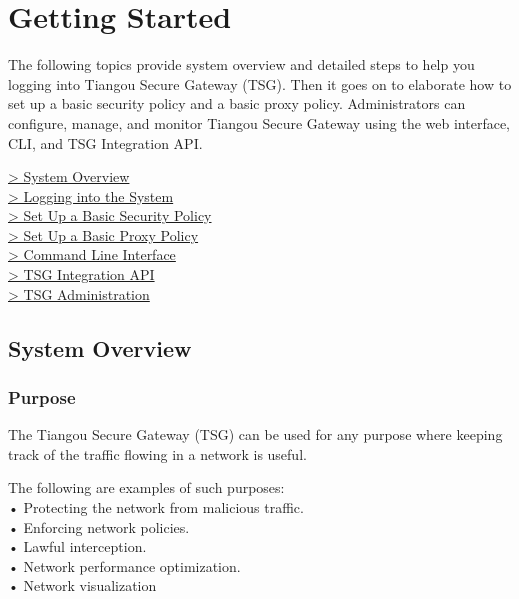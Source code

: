 
%
\chapter*{\hypertarget{link:Getting Started}{Getting Started}}
\label{sec:intro}

The following topics provide system overview and detailed steps to help you logging into Tiangou Secure Gateway (TSG). 
Then it goes on to elaborate how to set up a basic security policy and a basic proxy policy. 
Administrators can configure, manage, and monitor Tiangou Secure Gateway using the web interface, CLI, and TSG Integration API.

{
\color{linkblue}
\hyperlink{link:system overview}{> System Overview} \\
\hyperlink{link:Logging into the System}{> Logging into the System} \\
\hyperlink{link:Set Up a Basic Security Policy}{> Set Up a Basic Security Policy}\\
\hyperlink{link:Set Up a Basic Proxy Policy}{> Set Up a Basic Proxy Policy}\\
\hyperlink{link:Command Line Interface}{> Command Line Interface}\\
\hyperlink{link:TSG Integration API}{> TSG Integration API}\\
\hyperlink{link:TSG Administration}{> TSG Administration}\\
}
\clearpage

\section*{\hypertarget{link:system overview}{System Overview}}
\label{sec:intro:overview}

\subsection*{\hypertarget{link:Purpose}{Purpose}}
\label{sec:intro:overview:purpose}

The Tiangou Secure Gateway (TSG) can be used for any purpose where keeping track of the traffic flowing in a network is useful.


The following are examples of such purposes:\\
• Protecting the network from malicious traffic.\\
• Enforcing network policies.\\
• Lawful interception.\\
• Network performance optimization.\\
• Network visualization\\

